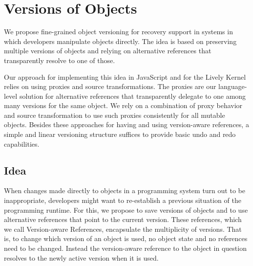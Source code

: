 \chapter{Versions of Objects} \label{sec:APPROACH}





We propose fine-grained object versioning for recovery support in systems in which developers manipulate objects directly.
The idea is based on preserving multiple versions of objects and relying on alternative references that transparently resolve to one of those.

Our approach for implementing this idea in JavaScript and for the Lively Kernel relies on using proxies and source transformations.
The proxies are our language-level solution for alternative references that transparently delegate to one among many versions for the same object.
We rely on a combination of proxy behavior and source transformation to use such proxies consistently for all mutable objects.
Besides these approaches for having and using version-aware references, a simple and linear versioning structure suffices to provide basic undo and redo capabilities.

\section{Idea}

When changes made directly to objects in a programming system turn out to be inappropriate, developers might want to re-establish a previous situation of the programming runtime.
For this, we propose to save versions of objects and to use alternative references that point to the current version.
These references, which we call Version-aware References, encapsulate the multiplicity of versions.
That is, to change which version of an object is used, no object state and no references need to be changed.
Instead the version-aware reference to the object in question resolves to the newly active version when it is used.

